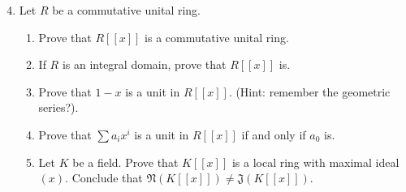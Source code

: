 \documentclass[11pt]{article}
\newcommand{\fJ}{\mathfrak{J}}
\newcommand{\fN}{\mathfrak{N}}
\begin{document}
\begin{enumerate}
  \setcounter{enumi}{3}
  \item{
  Let $R$ be a commutative unital ring.
  \begin{enumerate}
    \item{
    Prove that $R[[x]]$ is a commutative unital ring.
    }
    \item{
    If $R$ is an integral domain, prove that $R[[x]]$ is.
    }
    \item{
    Prove that $1-x$ is a unit in $R[[x]]$.  (Hint: remember the geometric series?).
    }
    \item{
    Prove that $\sum a_ix^i$ is a unit in $R[[x]]$ if and only if $a_0$ is.
    }
    \item{
    Let $K$ be a field.  Prove that $K[[x]]$ is a local ring with maximal ideal $(x)$.  Conclude that $\fN(K[[x]])\not=\fJ(K[[x]])$.
    }
  \end{enumerate}
  }
\end{enumerate}
\end{document}
